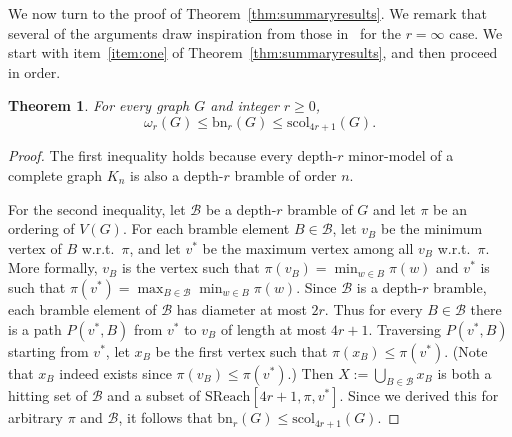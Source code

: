 \documentclass[final]{dmtcs-episciences}
\newtheorem{thm}{Theorem}
\theoremstyle{definition}
\theoremstyle{remark}
\newcommand{\dep}{depth}
\newcommand{\scol}{\ensuremath{\mathrm{scol}}}
\newcommand{\sreach}{\ensuremath{\mathrm{SReach}}}
\newcommand{\bn}{\ensuremath{\mathrm{bn}}}
\renewcommand{\leq}{\leqslant}
\renewcommand{\geq}{\geqslant}
\begin{document}
We now turn to the proof of Theorem~\ref{thm:summaryresults}. We remark that several of the arguments draw inspiration from those in~\cite{Reed} for the $r=\infty$ case.
We start with item~\ref{item:one} of Theorem~\ref{thm:summaryresults}, and then proceed in order.
\begin{thm}
For every graph $G$ and integer $r\geq0$, 
$$\omega_r(G)\leq \bn_r(G)\leq \scol_{4r+1}(G).$$
\end{thm}
\begin{proof}
The first inequality holds because every depth-$r$ minor-model of a complete graph $K_n$ is also a \dep-$r$ bramble of order $n$.

For the second inequality, let $\mathcal{B}$ be a \dep-$r$ bramble of $G$ and let $\pi$ be an ordering of $V(G)$. 
For each bramble element $B\in \mathcal{B}$, let $v_B$ be the minimum vertex of $B$ w.r.t.\ $\pi$, and let $v^*$ be the maximum vertex among all $v_B$  w.r.t.\ $\pi$. More formally, $v_B$ is the vertex such that $\pi(v_B)=\min_{w\in B} \pi(w)$ and $v^*$ is such that $\pi(v^*)= \max_{B \in \mathcal{B}} \min_{w\in B} \pi(w)$. 
Since $\mathcal{B}$ is a \dep-$r$ bramble, each bramble element of $\mathcal{B}$ has diameter at most $2r$. Thus for every $B\in \mathcal{B}$ there is a path $P(v^*,B)$ from $v^*$ to $v_B$ of length at most $4r+1$. Traversing $P(v^*,B)$ starting from $v^*$, let $x_B$ be the first vertex such that $\pi(x_B)\leq \pi(v^*)$. (Note that $x_B$ indeed exists since $\pi(v_B)\leq \pi(v^*)$.)
Then $X:=\bigcup_{B\in \mathcal{B}} x_{B}$ is both a hitting set of $\mathcal{B}$ and a subset of $\sreach[4r+1,\pi,v^*]$. Since we derived this for arbitrary $\pi$ and $\mathcal{B}$, it follows that $\bn_r(G) \leq \scol_{4r+1}(G)$.
\end{proof}
\end{document}
